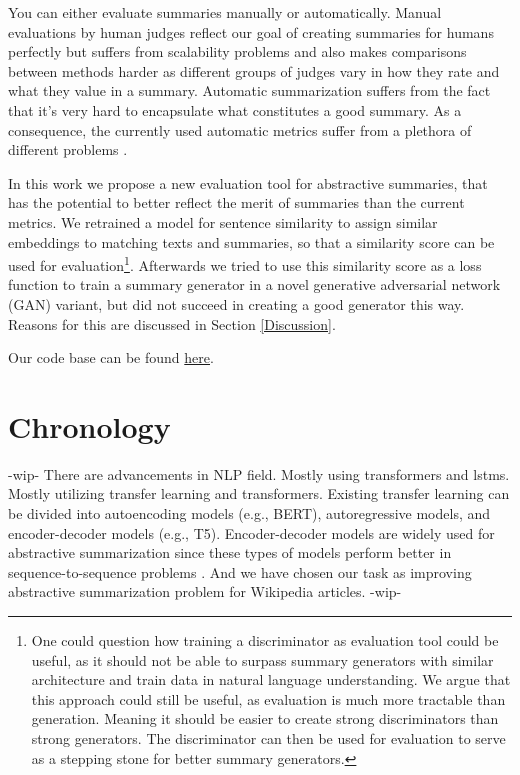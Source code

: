 \documentclass[11pt]{article}
\begin{document}
You can either evaluate summaries manually or automatically. Manual evaluations by human judges reflect our goal of creating summaries for humans perfectly but suffers from scalability problems and also makes comparisons between methods harder as different groups of judges vary in how they rate and what they value in a summary. Automatic summarization suffers from the fact that it's very hard to encapsulate what constitutes a good summary.
As a consequence, the currently used automatic metrics suffer from a plethora of different problems \cite{fabbri2021summeval}. 

In this work we propose a new evaluation tool for abstractive summaries, that has the potential to better reflect the merit of summaries than the current metrics. We retrained a model for sentence similarity to assign similar embeddings to matching texts and summaries, so that a similarity score can be used for evaluation\footnote{One could question how training a discriminator as evaluation tool could be useful, as it should not be able to surpass summary generators with similar architecture and train data in natural language understanding. We argue that this approach could still be useful, as evaluation is much more tractable than generation. Meaning it should be easier to create strong discriminators than strong generators. The discriminator can then be used for evaluation to serve as a stepping stone for better summary generators.}.
Afterwards we tried to use this similarity score as a loss function to train a summary generator in a novel generative adversarial network (GAN) variant, but did not succeed in creating a good generator this way. Reasons for this are discussed in Section \ref{Discussion}. 

Our code base can be found \href{https://gitlab.lrz.de/practical-courses/nlp-lab-course-ss22/wikipedia-abstractive-summarization}{here}.


\section{Chronology}\label{section:chronology}

-wip-
There are advancements in NLP field. Mostly using transformers and lstms. Mostly utilizing transfer learning and transformers. Existing transfer learning can be divided into autoencoding models (e.g., BERT), autoregressive models, and encoder-decoder models (e.g., T5). Encoder-decoder models are widely used for abstractive summarization since these types of models perform better in sequence-to-sequence problems \cite{glm}. And we have chosen our task as improving abstractive summarization problem for Wikipedia articles.
-wip-
\end{document}
